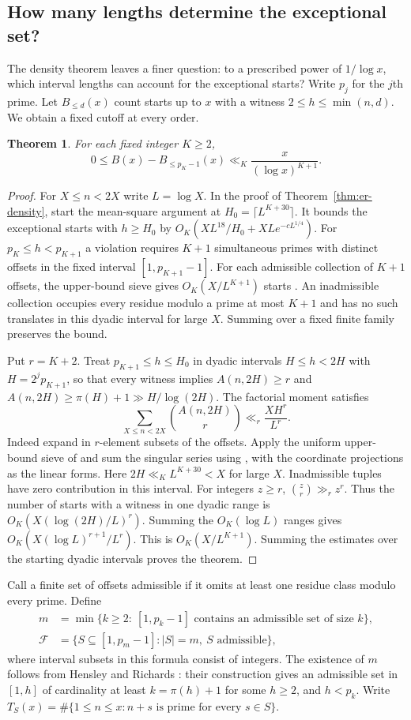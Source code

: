 \documentclass[11pt,a4paper]{article}
\newtheorem{theorem}{Theorem}[section]
\begin{document}
\subsection{How many lengths determine the exceptional set?}
The density theorem leaves a finer question: to a prescribed power of
$1/\log x$, which interval lengths can account for the exceptional starts?
Write $p_j$ for the $j$th prime. Let $B_{\le d}(x)$ count starts up to $x$
with a witness $2\le h\le\min(n,d)$. We obtain a fixed cutoff at every order.
\begin{theorem}\label{thm:projection}
For each fixed integer $K\ge2$,
\[
 0\le B(x)-B_{\le p_K-1}(x)\ll_K \frac{x}{(\log x)^{K+1}}.
\]
\end{theorem}
\begin{proof}
For $X\le n<2X$ write $L=\log X$. In the proof of
Theorem~\ref{thm:er-density}, start the mean-square argument at
$H_0=\lceil L^{K+30}\rceil$. It bounds the exceptional starts with
$h\ge H_0$ by $O_K(XL^{18}/H_0+XL e^{-cL^{1/4}})$.
For $p_K\le h<p_{K+1}$ a violation requires $K+1$ simultaneous primes
with distinct offsets in the fixed interval $[1,p_{K+1}-1]$.
For each admissible collection of $K+1$ offsets, the upper-bound
sieve gives $O_K(X/L^{K+1})$ starts \cite[Lemma 2.3]{lt}.
An inadmissible collection occupies every residue modulo a prime
at most $K+1$ and has no such translates in this dyadic interval for
large $X$. Summing over a fixed finite family preserves the bound.

Put $r=K+2$. Treat $p_{K+1}\le h\le H_0$ in dyadic intervals
$H\le h<2H$ with $H=2^j p_{K+1}$, so that every witness implies
$A(n,2H)\ge r$ and $A(n,2H)\ge \pi(H)+1\gg H/\log(2H)$.
The factorial moment satisfies
\[
 \sum_{X\le n<2X}\binom{A(n,2H)}{r}\ll_{r}\frac{XH^r}{L^r}.
\]
Indeed expand in $r$-element subsets of the offsets. Apply the uniform
upper-bound sieve of \cite[Lemma 2.3]{lt} and sum the singular series
using \cite[Corollary 2.6]{lt}, with the coordinate projections as the
linear forms. Here $2H\ll_K L^{K+30}<X$ for large $X$. Inadmissible
tuples have zero contribution in this interval. For integers $z\ge r$,
$\binom zr\gg_r z^r$. Thus the number of starts with a witness in
one dyadic range is $O_K(X(\log(2H)/L)^r)$. Summing the
$O_K(\log L)$ ranges gives $O_K(X(\log L)^{r+1}/L^r)$.
This is $O_K(X/L^{K+1})$. Summing the estimates over the starting
dyadic intervals proves the theorem.
\end{proof}

Call a finite set of offsets admissible if it omits at least one
residue class modulo every prime. Define
\begin{align*}
 m&=\min\{k\ge2:\ [1,p_k-1]\text{ contains an admissible set of size }k\},\\
 \mathcal F&=\{S\subseteq[1,p_m-1]: |S|=m,\ S\text{ admissible}\},
\end{align*}
where interval subsets in this formula consist of integers.
The existence of $m$ follows from Hensley and Richards
\cite{hensley}: their construction gives an admissible set in $[1,h]$
of cardinality at least $k=\pi(h)+1$ for some $h\ge2$, and $h<p_k$.
Write $T_S(x)=\#\{1\le n\le x : n+s\text{ is prime for every }s\in S\}$.
\end{document}
